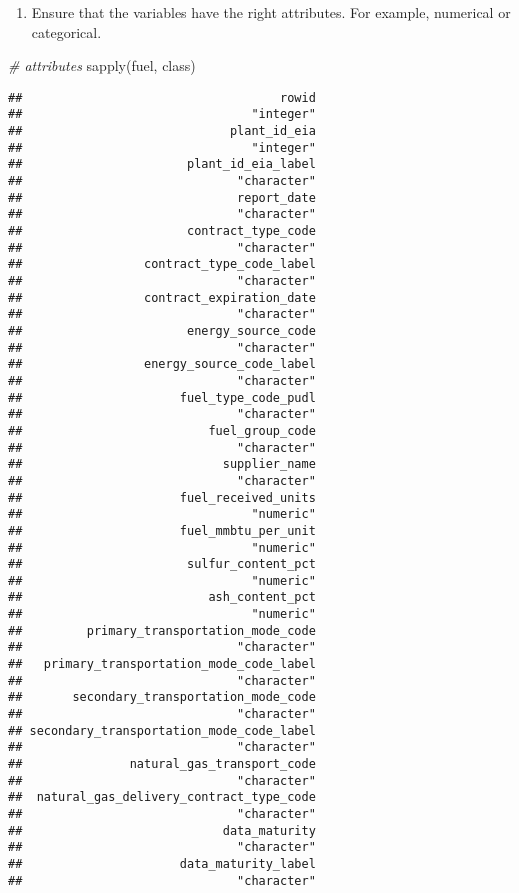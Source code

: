 \documentclass[
]{article}
\newenvironment{Shaded}{\begin{snugshade}}{\end{snugshade}}
\newcommand{\CommentTok}[1]{\textcolor[rgb]{0.56,0.35,0.01}{\textit{#1}}}
\newcommand{\FunctionTok}[1]{\textcolor[rgb]{0.00,0.00,0.00}{#1}}
\newcommand{\NormalTok}[1]{#1}
\providecommand{\tightlist}{%
  \setlength{\itemsep}{0pt}\setlength{\parskip}{0pt}}
\begin{document}
\begin{enumerate}
\def\labelenumi{\arabic{enumi}.}
\setcounter{enumi}{1}
\tightlist
\item
  Ensure that the variables have the right attributes. For example,
  numerical or categorical.
\end{enumerate}

\begin{Shaded}
\begin{Highlighting}[]
\CommentTok{\# attributes}
\FunctionTok{sapply}\NormalTok{(fuel, class)}
\end{Highlighting}
\end{Shaded}

\begin{verbatim}
##                                    rowid 
##                                "integer" 
##                             plant_id_eia 
##                                "integer" 
##                       plant_id_eia_label 
##                              "character" 
##                              report_date 
##                              "character" 
##                       contract_type_code 
##                              "character" 
##                 contract_type_code_label 
##                              "character" 
##                 contract_expiration_date 
##                              "character" 
##                       energy_source_code 
##                              "character" 
##                 energy_source_code_label 
##                              "character" 
##                      fuel_type_code_pudl 
##                              "character" 
##                          fuel_group_code 
##                              "character" 
##                            supplier_name 
##                              "character" 
##                      fuel_received_units 
##                                "numeric" 
##                      fuel_mmbtu_per_unit 
##                                "numeric" 
##                       sulfur_content_pct 
##                                "numeric" 
##                          ash_content_pct 
##                                "numeric" 
##         primary_transportation_mode_code 
##                              "character" 
##   primary_transportation_mode_code_label 
##                              "character" 
##       secondary_transportation_mode_code 
##                              "character" 
## secondary_transportation_mode_code_label 
##                              "character" 
##               natural_gas_transport_code 
##                              "character" 
##  natural_gas_delivery_contract_type_code 
##                              "character" 
##                            data_maturity 
##                              "character" 
##                      data_maturity_label 
##                              "character"
\end{verbatim}
\end{document}
